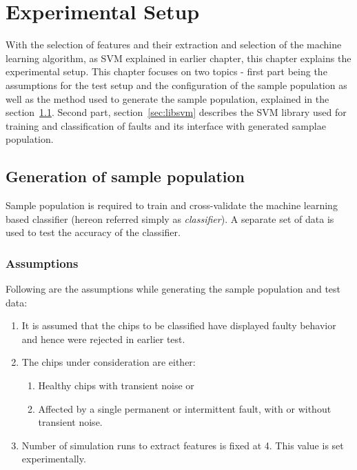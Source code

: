 \chapter{Experimental Setup}
\label{chap:chapter5}
With the selection of features and their extraction and selection of the machine learning algorithm, as SVM explained in earlier chapter, this chapter explains the experimental setup. This chapter focuses on two topics - first part being the assumptions for the test setup and the configuration of the sample population as well as the method used to generate the sample population, explained in the section~\ref{sec:gsp}. Second part, section~\ref{sec:libsvm} describes the SVM library used for training and classification of faults and its interface with generated samplae population.
\section{Generation of sample population}
\label{sec:gsp}
Sample population is required to train and cross-validate the machine learning based classifier (hereon referred simply as \emph{classifier}). A separate set of data is used to test the accuracy of the classifier.
\subsection{Assumptions}
\label{sec:gsp:assumptions}
Following are the assumptions while generating the sample population and test data:
\begin{enumerate}
  \item It is assumed that the chips to be classified have displayed faulty behavior and hence were rejected in earlier test.
  \item The chips under consideration are either:
		  \begin{enumerate}
    		\item Healthy chips with transient noise or
    		\item Affected by a single permanent or intermittent fault, with or without transient noise.
 		 \end{enumerate}
	\item Number of simulation runs to extract features is fixed at 4. This value is set experimentally. 
\end{enumerate}

